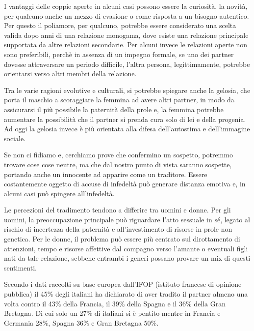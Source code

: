 \documentclass[12pt]{book} %
\begin{document}
I vantaggi delle coppie aperte in alcuni casi possono essere la curiosità, la novità, per qualcuno anche un mezzo di evasione o come risposta a un bisogno autentico. Per questo il poliamore, per qualcuno, potrebbe essere considerato una scelta valida dopo anni di una relazione monogama, dove esiste una relazione principale supportata da altre relazioni secondarie. Per alcuni invece le relazioni aperte non sono preferibili, perchè in assenza di un impegno formale, se uno dei partner dovesse attraversare un periodo difficile, l'altra persona, legittimamente, potrebbe orientarsi verso altri membri della relazione.

Tra le varie ragioni evolutive e culturali, si potrebbe spiegare anche la gelosia, che porta il maschio a scoraggiare la femmina ad avere altri partner, in modo da assicurarsi il più possibile la paternità della prole e, la femmina potrebbe aumentare la possibilità che il partner si prenda cura solo di lei e della progenia. Ad oggi la gelosia invece è più orientata alla difesa dell'autostima e dell'immagine sociale. 

Se non ci fidiamo e, cerchiamo prove che confermino un sospetto, potremmo trovare cose cose neutre, ma che dal nostro punto di vista saranno sospette, portando anche un innocente ad apparire come un traditore. Essere costantemente oggetto di accuse di infedeltà può generare distanza emotiva e, in alcuni casi può spingere all'infedeltà.

Le percezioni del tradimento tendono a differire tra uomini e donne. Per gli uomini, la preoccupazione principale può riguardare l'atto sessuale in sé, legato al rischio di incertezza della paternità e all'investimento di risorse in prole non genetica. Per le donne, il problema può essere più centrato sul dirottamento di attenzioni, tempo e risorse affettive dal compagno verso l'amante o eventuali figli nati da tale relazione, sebbene entrambi i generi possano provare un mix di questi sentimenti.

Secondo i dati raccolti su base europea dall'IFOP (istituto francese di opinione pubblica) il 45\% degli italiani ha dichiarato di
aver tradito il partner almeno una volta contro il 43\% della Francia, il 39\% della Spagna e il 36\% della Gran
Bretagna. Di cui solo un 27\% di italiani si è pentito mentre in Francia e Germania 28\%, Spagna 36\% e Gran Bretagna 50\%. 
\end{document}
